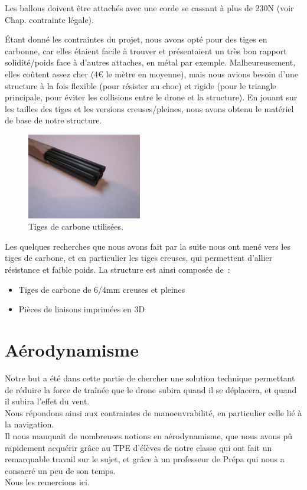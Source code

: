 \documentclass[a4paper,11pt]{article}
\begin{document}
Les ballons doivent être attachés avec une corde se cassant à plus de 230N (voir Chap. contrainte légale).

Étant donné les contraintes du projet, nous avons opté pour des tiges en carbonne, car elles étaient facile à trouver et présentaient un très bon rapport solidité/poids face à d'autres attaches, en métal par exemple. Malheureusement, elles coûtent assez cher (4€ le mètre en moyenne), mais nous avions besoin d'une structure à la fois flexible (pour résister au choc) et rigide (pour le triangle principale, pour éviter les collisions entre le drone et la structure). En jouant sur les tailles des tiges et les versions creuses/pleines, nous avons obtenu le matériel de base de notre structure.

\begin{figure}[H]
	\centering
	\includegraphics[width=5cm]{../Images/tige_carbone.JPG}
	\caption{Tiges de carbone utilisées.}
\end{figure}


Les quelques recherches que nous avons fait par la suite nous ont mené vers les tiges de carbone, et en particulier les tiges creuses, qui permettent d'allier résistance et faible poids.
La structure est ainsi composée de~:
\begin{itemize}
        \item Tiges de carbone de 6/4mm creuses et pleines
        \item Pièces de liaisons imprimées en 3D
\end{itemize}

\section{Aérodynamisme}
	Notre but a été dans cette partie de chercher une solution technique permettant de réduire la force de traînée que le drone subira quand il se déplacera, et quand il subira l'effet du vent. \\
	Nous répondons ainsi aux contraintes de manoeuvrabilité, en particulier celle lié à la navigation.\\
	Il nous manquait de nombreuses notions en aérodynamisme, que nous avons pû rapidement acquérir grâce au TPE d'élèves de notre classe qui ont fait un remarquable travail sur le sujet, et grâce à un professeur de Prépa qui nous a consacré un peu de son temps.\\
	Nous les remercions ici.
\end{document}

